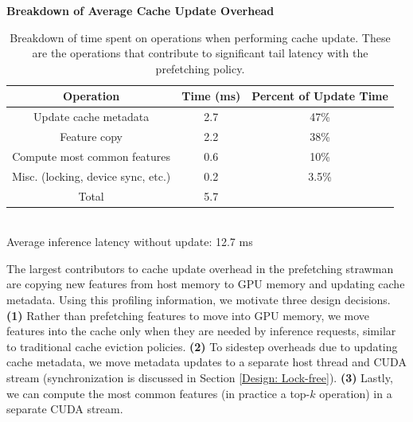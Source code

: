 \begin{table}[h!]
    \begin{center}
        \textbf{Breakdown of Average Cache Update Overhead}
        \begin{tabular}{|c c c|} 
        \hline
        \textbf{Operation} & \textbf{Time (ms)} & \textbf{Percent of Update Time} \\ [0.5ex] 
        \hline\hline
        Update cache metadata & 2.7 & 47\%  \\
        \hline
        Feature copy & 2.2 & 38\% \\
        \hline
        Compute most common features & 0.6 & 10\% \\
        \hline
        Misc. (locking, device sync, etc.) & 0.2 & 3.5\% \\
        \hline
        Total & 5.7 & \\
        \hline
        \end{tabular} \\
        Average inference latency without update: 12.7 ms
    \end{center}
    
    \caption{Breakdown of time spent on operations when performing cache update.
    These are the operations that contribute to significant tail latency with the prefetching policy.
    }
    \label{Update latencies}
\end{table}

The largest contributors to cache update overhead in the prefetching strawman are copying new features from host memory to GPU memory and updating cache metadata.
Using this profiling information, we motivate three design decisions.
\textbf{(1)} Rather than prefetching features to move into GPU memory, we move features into the cache only when they are needed by inference requests, similar to traditional cache eviction policies. 
\textbf{(2)} To sidestep overheads due to updating cache metadata, we move metadata updates to a separate host thread and CUDA stream (synchronization is discussed in Section \ref{Design: Lock-free}).
\textbf{(3)} Lastly, we can compute the most common features (in practice a top-$k$ operation) in a separate CUDA stream.


